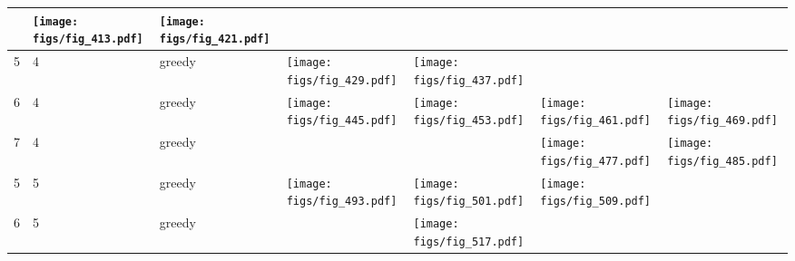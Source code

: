 \documentclass[oneside,canadian,landscape]{article}
\begin{document}
\begin{center}
\begin{longtable}{|l|l|l||l|l|l|l|}
&\begin{minipage}{3.5cm}
\texttt{[image: figs/fig\_413.pdf]}
\end{minipage}
&\begin{minipage}{3.5cm}
\texttt{[image: figs/fig\_421.pdf]}
\end{minipage}
\\ \hline
5&4&greedy&\begin{minipage}{3.5cm}
\texttt{[image: figs/fig\_429.pdf]}
\end{minipage}
&\begin{minipage}{3.5cm}
\texttt{[image: figs/fig\_437.pdf]}
\end{minipage}
&&\\ \hline
6&4&greedy&\begin{minipage}{3.5cm}
\texttt{[image: figs/fig\_445.pdf]}
\end{minipage}
&\begin{minipage}{3.5cm}
\texttt{[image: figs/fig\_453.pdf]}
\end{minipage}
&\begin{minipage}{3.5cm}
\texttt{[image: figs/fig\_461.pdf]}
\end{minipage}
&\begin{minipage}{3.5cm}
\texttt{[image: figs/fig\_469.pdf]}
\end{minipage}
\\ \hline
7&4&greedy&&&\begin{minipage}{3.5cm}
\texttt{[image: figs/fig\_477.pdf]}
\end{minipage}
&\begin{minipage}{3.5cm}
\texttt{[image: figs/fig\_485.pdf]}
\end{minipage}
\\ \hline
5&5&greedy&\begin{minipage}{3.5cm}
\texttt{[image: figs/fig\_493.pdf]}
\end{minipage}
&\begin{minipage}{3.5cm}
\texttt{[image: figs/fig\_501.pdf]}
\end{minipage}
&\begin{minipage}{3.5cm}
\texttt{[image: figs/fig\_509.pdf]}
\end{minipage}
&\\ \hline
6&5&greedy&&\begin{minipage}{3.5cm}
\texttt{[image: figs/fig\_517.pdf]}

\end{minipage}
\end{longtable}
\end{center}
\end{document}
